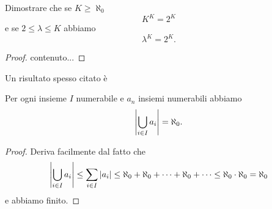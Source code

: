 \documentclass[11pt]{scrartcl}
\begin{document}
 	\begin{example}[Funzioni]
 		Dimostrare che se $K\ge \aleph_0$
 		$$K^K=2^K$$
 		e se $2\le \lambda\le K$ abbiamo
 		$$\lambda^K=2^K.$$
 	\end{example}
 	\begin{proof}
 		contenuto...
 	\end{proof}
 	Un risultato spesso citato è
 	\begin{corollary}
 		Per ogni insieme $I$ numerabile e $a_n$ insiemi numerabili abbiamo
 		$$\left\lvert \bigcup_{i\in I}a_i \right\rvert=\aleph_0.$$
 	\end{corollary}
 	\begin{proof}
 		Deriva facilmente dal fatto che 
 		$$\left\lvert \bigcup_{i\in I}a_i \right\rvert\le \sum_{i\in I}\left\lvert a_i \right\rvert\le \aleph_0+\aleph_0+\dots+\aleph_0+\dots\le \aleph_0 \cdot \aleph_0=\aleph_0$$
 		e abbiamo finito.
 	\end{proof}
 	\newpage
\end{document}
